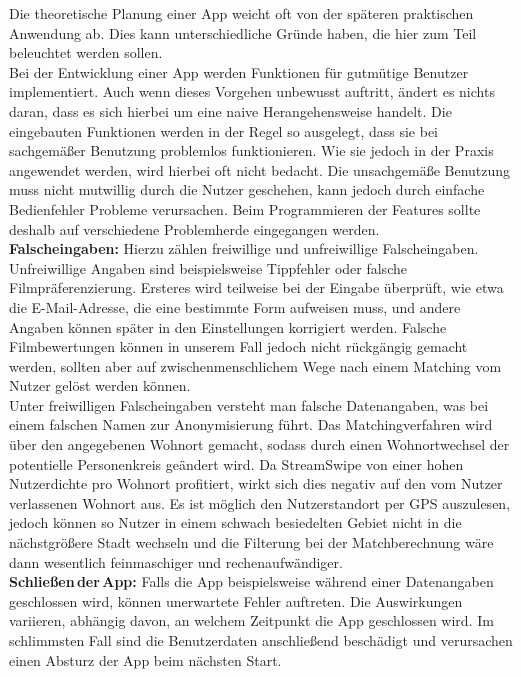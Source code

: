 Die theoretische Planung einer App weicht oft von der späteren praktischen Anwendung ab. Dies kann unterschiedliche Gründe haben, die hier zum Teil beleuchtet werden sollen.\\

\noindent
Bei der Entwicklung einer App werden Funktionen für gutmütige Benutzer implementiert. Auch wenn dieses Vorgehen unbewusst auftritt, ändert es nichts daran, dass es sich hierbei um eine naive Herangehensweise handelt. Die eingebauten Funktionen werden in der Regel so ausgelegt, dass sie bei sachgemäßer Benutzung problemlos funktionieren. Wie sie jedoch  in der Praxis angewendet werden, wird hierbei oft nicht bedacht. Die unsachgemäße Benutzung muss nicht mutwillig durch die Nutzer geschehen, kann jedoch durch einfache Bedienfehler Probleme verursachen. Beim Programmieren der Features sollte deshalb auf verschiedene Problemherde eingegangen werden.\\

\noindent
{}
\textbf{Falscheingaben:} Hierzu zählen freiwillige und unfreiwillige Falscheingaben. Unfreiwillige Angaben sind beispielsweise Tippfehler oder falsche Filmpräferenzierung. Ersteres wird teilweise bei der Eingabe überprüft, wie etwa die E-Mail-Adresse, die eine bestimmte Form aufweisen muss, und andere Angaben können später in den Einstellungen korrigiert werden. Falsche Filmbewertungen können in unserem Fall jedoch nicht rückgängig gemacht werden, sollten aber auf zwischenmenschlichem Wege nach einem Matching vom Nutzer gelöst werden können.\\
Unter freiwilligen Falscheingaben versteht man falsche Datenangaben, was bei einem falschen Namen zur Anonymisierung führt. Das Matchingverfahren wird über den angegebenen Wohnort gemacht, sodass durch einen Wohnortwechsel der potentielle Personenkreis geändert wird. Da StreamSwipe von einer hohen Nutzerdichte pro Wohnort profitiert, wirkt sich dies negativ auf den vom Nutzer verlassenen Wohnort aus. Es ist möglich den Nutzerstandort per GPS auszulesen, jedoch können so Nutzer in einem schwach besiedelten Gebiet nicht in die nächstgrößere Stadt wechseln und die Filterung bei der Matchberechnung wäre dann wesentlich feinmaschiger und rechenaufwändiger.\\

\noindent
{}
\textbf{Schließen\,der\,App:} Falls die App beispielsweise während einer Datenangaben geschlossen wird, können unerwartete Fehler auftreten. Die Auswirkungen  variieren,  abhängig davon, an welchem Zeitpunkt die App geschlossen wird. Im schlimmsten Fall sind die Benutzerdaten anschließend beschädigt und verursachen einen Absturz der App beim nächsten Start.\\

